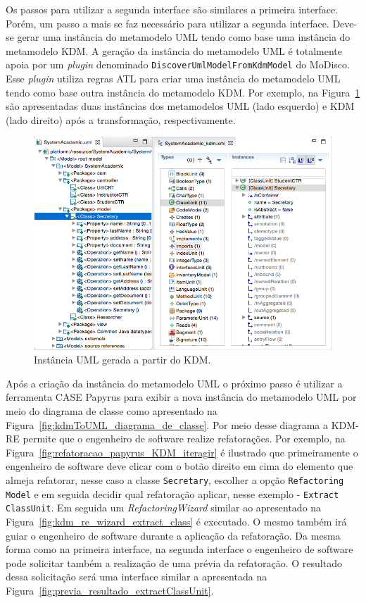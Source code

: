 Os passos para utilizar a segunda interface são similares a primeira interface. Porém, um passo a mais se faz necessário para utilizar a segunda interface. Deve-se gerar uma instância do metamodelo UML tendo como base uma instância do metamodelo KDM. A geração da instância do metamodelo UML é totalmente apoia por um \textit{plugin} denominado \texttt{DiscoverUmlModelFromKdmModel} do MoDisco. Esse \textit{plugin} utiliza regras ATL para criar uma instância do metamodelo UML tendo como base outra instância do metamodelo KDM. Por exemplo, na Figura~\ref{fig:kdmToUML} são apresentadas duas instâncias dos metamodelos UML (lado esquerdo) e KDM (lado direito) após a transformação, respectivamente.

\begin{figure}[!h]
	\centering
	\caption{Instância UML gerada a partir do KDM.}
	\label{fig:kdmToUML}
	\includegraphics[scale=0.5]{images/kdmToUML}
	\fautor
\end{figure}

Após a criação da instância do metamodelo UML o próximo passo é utilizar a ferramenta CASE Papyrus para exibir a nova instância do metamodelo UML por meio do diagrama de classe como apresentado na Figura~\ref{fig:kdmToUML_diagrama_de_classe}. Por meio desse diagrama a KDM-RE permite que o engenheiro de software realize refatorações. Por exemplo, na Figura~\ref{fig:refatoracao_papyrus_KDM_iteragir} é ilustrado que primeiramente o engenheiro de software deve clicar com o botão direito em cima do elemento que almeja refatorar, nesse caso a classe \texttt{Secretary}, escolher a opção \texttt{Refactoring Model} e em seguida decidir qual refatoração aplicar, nesse exemplo - \texttt{Extract ClassUnit}. Em seguida um \textit{RefactoringWizard} similar ao apresentado na Figura~\ref{fig:kdm_re_wizard_extract_class} é executado. O mesmo também irá guiar o engenheiro de software durante a aplicação da refatoração. Da mesma forma como na primeira interface, na segunda interface o engenheiro de software pode solicitar também a realização de uma prévia da refatoração. O resultado dessa solicitação será uma interface similar a apresentada na Figura~\ref{fig:previa_resultado_extractClassUnit}.

